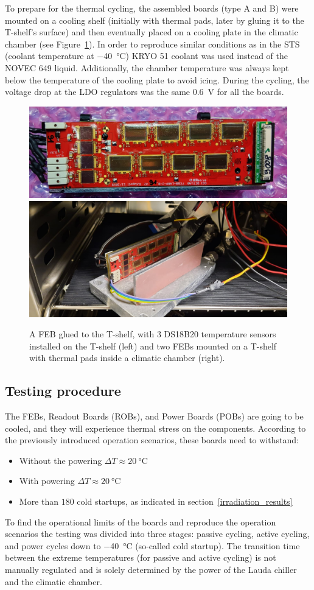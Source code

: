 To prepare for the thermal cycling, the assembled boards (type A and B) were mounted on a cooling shelf (initially with thermal pads, later by gluing it to the T-shelf’s surface) and then eventually placed on a cooling plate in the climatic chamber (see Figure~\ref{fig_cycling_temps}). In order to reproduce similar conditions as in the \gls{STS} (coolant temperature at \SI{-40}{\celsius}) KRYO 51 coolant was used instead of the NOVEC 649 liquid. Additionally, the chamber temperature was always kept below the temperature of the cooling plate to avoid icing. During the cycling, the voltage drop at the \gls{LDO} regulators was the same \SI{0.6}{\volt} for all the boards.

\begin{figure}[!h]
\centering
\includegraphics[width=0.5\columnwidth]{Chapter4/images/FEBB_T_sensors.jpeg}
\includegraphics[width=0.4\columnwidth]{Chapter4/images/thermal_setup.jpeg}
\caption{A \gls{FEB} glued to the T-shelf, with 3 DS18B20 temperature sensors installed on the T-shelf (left) and two \gls{FEB}s mounted on a T-shelf with thermal pads inside a climatic chamber (right).}
\label{fig_cycling_temps}
\end{figure}


\subsection{Testing procedure}
The \glspl{FEB}, Readout Boards (\glspl{ROB}), and  Power Boards (\glspl{POB}) are going to be cooled, and they will experience thermal stress on the components. According to the previously introduced operation scenarios, these boards need to withstand:
\begin{itemize}
    \item Without the powering $\Delta T\approx\SI{20}{\celsius} $
    \item With powering $\Delta T\approx\SI{20}{\celsius} $
    \item More than $180$ cold startups, as indicated in section~\ref{irradiation_results}
\end{itemize}
To find the operational limits of the boards and reproduce the operation scenarios the testing was divided into three stages: passive cycling, active cycling, and power cycles down to \SI{-40}{\celsius} (so-called cold startup). The transition time between the extreme temperatures (for passive and active cycling) is not manually regulated and is solely determined by the power of the Lauda chiller and the climatic chamber.

